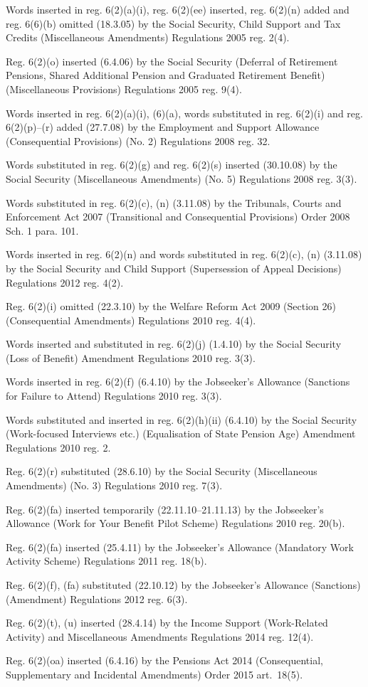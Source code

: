 \documentclass[12pt,a4paper]{article}
\begin{document}
{Words inserted in reg. 6(2)(a)(i), reg. 6(2)(ee) inserted, reg. 6(2)(n) added and reg. 6(6)(b) omitted (18.3.05) by the Social Security, Child Support and Tax Credits (Miscellaneous Amendments) Regulations 2005 reg. 2(4).

Reg. 6(2)(o) inserted (6.4.06) by the Social Security (Deferral of Retirement Pensions, Shared Additional Pension and Graduated Retirement Benefit) (Miscellaneous Provisions) Regulations 2005 reg. 9(4).

\begin{sloppypar}
Words inserted in reg. 6(2)(a)(i), (6)(a), words substituted in reg. 6(2)(i) and reg. 6(2)(p)--(r) added (27.7.08) by the Employment and Support Allowance (Consequential Provisions) (No. 2) Regulations 2008 reg. 32.
\end{sloppypar}

Words substituted in reg. 6(2)(g) and reg. 6(2)(s) inserted (30.10.08) by the Social Security (Miscellaneous Amendments) (No. 5) Regulations 2008 reg. 3(3).

Words substituted in reg. 6(2)(c), (n) (3.11.08) by the Tribunals, Courts and Enforcement Act 2007 (Transitional and Consequential Provisions) Order 2008 Sch. 1 para. 101.

Words inserted in reg. 6(2)(n) and words substituted in reg. 6(2)(c), (n) (3.11.08) by the Social Security and Child Support (Supersession of Appeal Decisions) Regulations 2012 reg. 4(2).

Reg. 6(2)(i) omitted (22.3.10) by the Welfare Reform Act 2009 (Section 26) (Consequential Amendments) Regulations 2010 reg. 4(4).

Words inserted and substituted in reg. 6(2)(j) (1.4.10) by the Social Security (Loss of Benefit) Amendment Regulations 2010 reg. 3(3).

Words inserted in reg. 6(2)(f) (6.4.10) by the Jobseeker’s Allowance (Sanctions for Failure to Attend) Regulations 2010 reg. 3(3).

Words substituted and inserted in reg. 6(2)(h)(ii) (6.4.10) by the Social Security (Work-focused Interviews etc.) (Equalisation of State Pension Age) Amendment Regulations 2010 reg. 2.

Reg. 6(2)(r) substituted (28.6.10) by the Social Security (Miscellaneous Amendments) (No. 3) Regulations 2010 reg. 7(3).

Reg. 6(2)(fa) inserted temporarily (22.11.10--21.11.13) by the Jobseeker’s Allowance (Work for Your Benefit Pilot Scheme) Regulations 2010 reg. 20(b).

Reg. 6(2)(fa) inserted (25.4.11) by the Jobseeker’s Allowance (Mandatory Work Activity Scheme) Regulations 2011 reg. 18(b).

Reg. 6(2)(f), (fa) substituted (22.10.12) by the Jobseeker’s Allowance (Sanctions) (Amendment) Regulations 2012 reg. 6(3).

Reg. 6(2)(t), (u) inserted (28.4.14) by the Income Support (Work-Related Activity) and Miscellaneous Amendments Regulations 2014 reg. 12(4).

Reg. 6(2)(oa) inserted (6.4.16) by the Pensions Act 2014 (Consequential, Supplementary and Incidental Amendments) Order 2015 art.~18(5).
}
\end{document}
